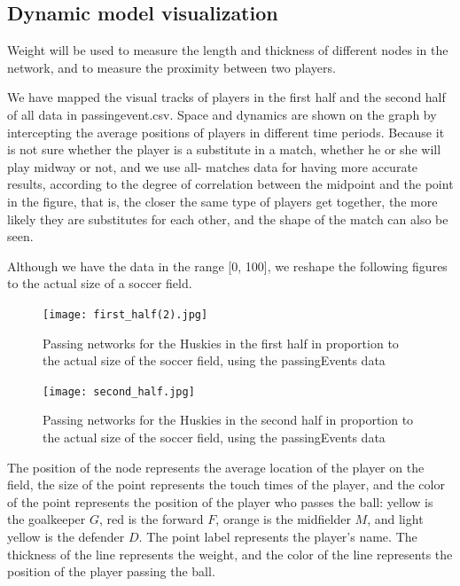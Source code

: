 \documentclass{mcmthesis}
\begin{document}
\subsection{Dynamic model visualization} %

Weight will be used to measure the length and thickness of different nodes in the network, and to measure the proximity between two players. 

We have mapped the visual tracks of players in the first half and the second half of all data in passingevent.csv. Space and dynamics are shown on the graph by intercepting the average positions of players in different time periods. Because it is not sure whether the player is a substitute in a match, whether he or she will play midway or not, and we use all- matches data for having more accurate results, according to the degree of correlation between the midpoint and the point in the figure, that is, the closer the same type of players get together, the more likely they are substitutes for each other, and the shape of the match can also be seen. 


Although we have the data in the range [0, 100], we reshape the following figures to the actual size of a soccer field.
\begin{figure}[h]
	\begin{minipage}[t]{0.5\textwidth}
		\centering
		\texttt{[image: first\_half(2).jpg]}
		\caption{Passing networks for the Huskies in the first half in proportion to the actual size of the soccer field, using the passingEvents data\label{fig:aa}}
	\end{minipage}
	\qquad
	\begin{minipage}[t]{0.5\textwidth}
		\centering
		\texttt{[image: second\_half.jpg]}
		\caption{Passing networks for the Huskies in the second half in proportion to the actual size of the soccer field, using the passingEvents data\label{fig:aa}}
	\end{minipage}
\end{figure}


The position of the node represents the average location of the player on the field, the size of the point represents the touch times of the player, and the color of the point represents the position of the player who passes the ball: yellow is the goalkeeper $G$, red is the forward $F$, orange is the midfielder $M$, and light yellow is the defender $D$. The point label represents the player's name. The thickness of the line represents the weight, and the color of the line represents the position of the player passing the ball.
\end{document}
